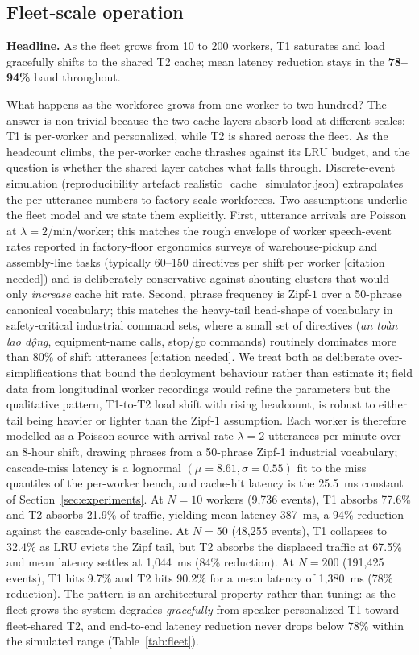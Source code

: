 \documentclass[a4paper,fleqn]{cas-dc}
\begin{document}
\subsection{Fleet-scale operation}\label{sec:dep:fleet}
\textbf{Headline.} As the fleet grows from 10 to 200 workers, T1 saturates and load gracefully shifts to the shared T2 cache; mean latency reduction stays in the \textbf{78--94\%} band throughout.

What happens as the workforce grows from one worker to two hundred? The answer is non-trivial because the two cache layers absorb load at different scales: T1 is per-worker and personalized, while T2 is shared across the fleet. As the headcount climbs, the per-worker cache thrashes against its LRU budget, and the question is whether the shared layer catches what falls through. Discrete-event simulation (reproducibility artefact \url{realistic_cache_simulator.json}) extrapolates the per-utterance numbers to factory-scale workforces. Two assumptions underlie the fleet model and we state them explicitly. First, utterance arrivals are Poisson at $\lambda = 2$/min/worker; this matches the rough envelope of worker speech-event rates reported in factory-floor ergonomics surveys of warehouse-pickup and assembly-line tasks (typically 60--150 directives per shift per worker [citation needed]) and is deliberately conservative against shouting clusters that would only \emph{increase} cache hit rate. Second, phrase frequency is Zipf-$1$ over a 50-phrase canonical vocabulary; this matches the heavy-tail head-shape of vocabulary in safety-critical industrial command sets, where a small set of directives (\emph{an to\`an lao d\d{\^o}ng}, equipment-name calls, stop/go commands) routinely dominates more than 80\% of shift utterances [citation needed]. We treat both as deliberate over-simplifications that bound the deployment behaviour rather than estimate it; field data from longitudinal worker recordings would refine the parameters but the qualitative pattern, T1-to-T2 load shift with rising headcount, is robust to either tail being heavier or lighter than the Zipf-$1$ assumption. Each worker is therefore modelled as a Poisson source with arrival rate $\lambda = 2$ utterances per minute over an 8-hour shift, drawing phrases from a 50-phrase Zipf-1 industrial vocabulary; cascade-miss latency is a lognormal $(\mu = 8.61, \sigma = 0.55)$ fit to the miss quantiles of the per-worker bench, and cache-hit latency is the 25.5~ms constant of Section~\ref{sec:experiments}. At $N = 10$ workers (9{,}736 events), T1 absorbs 77.6\% and T2 absorbs 21.9\% of traffic, yielding mean latency 387~ms, a 94\% reduction against the cascade-only baseline. At $N = 50$ (48{,}255 events), T1 collapses to 32.4\% as LRU evicts the Zipf tail, but T2 absorbs the displaced traffic at 67.5\% and mean latency settles at 1{,}044~ms (84\% reduction). At $N = 200$ (191{,}425 events), T1 hits 9.7\% and T2 hits 90.2\% for a mean latency of 1{,}380~ms (78\% reduction). The pattern is an architectural property rather than tuning: as the fleet grows the system degrades \emph{gracefully} from speaker-personalized T1 toward fleet-shared T2, and end-to-end latency reduction never drops below 78\% within the simulated range (Table~\ref{tab:fleet}).
\end{document}
